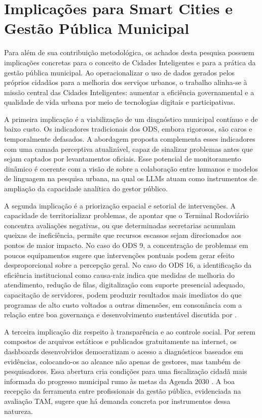 \section{Implicações para Smart Cities e Gestão Pública Municipal}
\label{sec:disc-implicacoes}

Para além de sua contribuição metodológica, os achados desta pesquisa possuem implicações concretas para o conceito de Cidades Inteligentes e para a prática da gestão pública municipal. Ao operacionalizar o uso de dados gerados pelos próprios cidadãos para a melhoria dos serviços urbanos, o trabalho alinha-se à missão central das Cidades Inteligentes: aumentar a eficiência governamental e a qualidade de vida urbana por meio de tecnologias digitais e participativas.

A primeira implicação é a viabilização de um diagnóstico municipal contínuo e de baixo custo. Os indicadores tradicionais dos ODS, embora rigorosos, são caros e temporalmente defasados. A abordagem proposta complementa esses indicadores com uma camada perceptiva atualizável, capaz de sinalizar problemas antes que sejam captados por levantamentos oficiais. Esse potencial de monitoramento dinâmico é coerente com a visão de \citeauthor{fu2023} \citeyear{fu2023} sobre a colaboração entre humanos e modelos de linguagem na pesquisa urbana, na qual os LLMs atuam como instrumentos de ampliação da capacidade analítica do gestor público.

A segunda implicação é a priorização espacial e setorial de intervenções. A capacidade de territorializar problemas, de apontar que o Terminal Rodoviário concentra avaliações negativas, ou que determinadas secretarias acumulam queixas de ineficiência, permite que recursos escassos sejam direcionados aos pontos de maior impacto. No caso do ODS 9, a concentração de problemas em poucos equipamentos sugere que intervenções pontuais podem gerar efeito desproporcional sobre a percepção geral. No caso do ODS 16, a identificação da eficiência institucional como causa-raiz indica que medidas de melhoria do atendimento, redução de filas, digitalização com suporte presencial adequado, capacitação de servidores, podem produzir resultados mais imediatos do que programas de alto custo voltados a outras dimensões, em consonância com a relação entre boa governança e desenvolvimento sustentável discutida por \citeauthor{massey2022} \citeyear{massey2022}.

A terceira implicação diz respeito à transparência e ao controle social. Por serem compostos de arquivos estáticos e publicados gratuitamente na internet, os dashboards desenvolvidos democratizam o acesso a diagnósticos baseados em evidências, colocando-os ao alcance não apenas de gestores, mas também de pesquisadores. Essa abertura cria condições para uma fiscalização cidadã mais informada do progresso municipal rumo às metas da Agenda 2030 \cite{onu2015}. A boa recepção da ferramenta entre profissionais da gestão pública, evidenciada na avaliação TAM, sugere que há demanda concreta por instrumentos dessa natureza.

